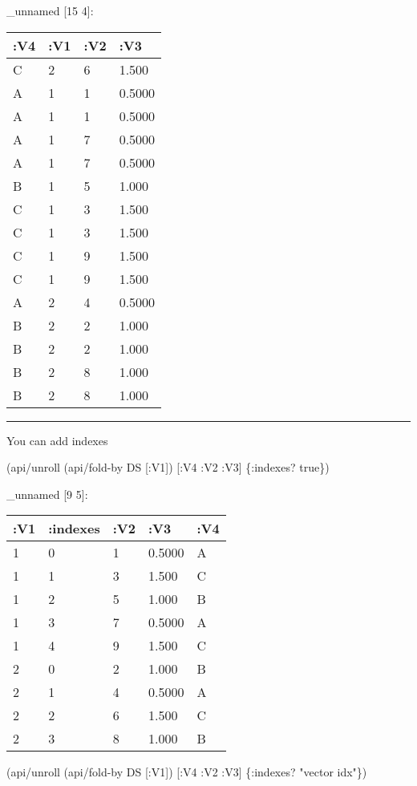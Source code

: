 \documentclass[]{article}
\newenvironment{Shaded}{\begin{snugshade}}{\end{snugshade}}
\newcommand{\StringTok}[1]{\textcolor[rgb]{0.31,0.60,0.02}{#1}}
\newcommand{\VariableTok}[1]{\textcolor[rgb]{0.00,0.00,0.00}{#1}}
\newcommand{\AttributeTok}[1]{\textcolor[rgb]{0.77,0.63,0.00}{#1}}
\newcommand{\NormalTok}[1]{#1}
\begin{document}
\_unnamed {[}15 4{]}:

\begin{longtable}[]{@{}llll@{}}
\toprule
:V4 & :V1 & :V2 & :V3\tabularnewline
\midrule
\endhead
C & 2 & 6 & 1.500\tabularnewline
A & 1 & 1 & 0.5000\tabularnewline
A & 1 & 1 & 0.5000\tabularnewline
A & 1 & 7 & 0.5000\tabularnewline
A & 1 & 7 & 0.5000\tabularnewline
B & 1 & 5 & 1.000\tabularnewline
C & 1 & 3 & 1.500\tabularnewline
C & 1 & 3 & 1.500\tabularnewline
C & 1 & 9 & 1.500\tabularnewline
C & 1 & 9 & 1.500\tabularnewline
A & 2 & 4 & 0.5000\tabularnewline
B & 2 & 2 & 1.000\tabularnewline
B & 2 & 2 & 1.000\tabularnewline
B & 2 & 8 & 1.000\tabularnewline
B & 2 & 8 & 1.000\tabularnewline
\bottomrule
\end{longtable}

\begin{center}\rule{0.5\linewidth}{0.5pt}\end{center}

You can add indexes

\begin{Shaded}
\begin{Highlighting}[]
\NormalTok{(api/unroll (api/fold-by DS [}\AttributeTok{:V1}\NormalTok{]) [}\AttributeTok{:V4} \AttributeTok{:V2} \AttributeTok{:V3}\NormalTok{] \{}\AttributeTok{:indexes}\NormalTok{? }\VariableTok{true}\NormalTok{\})}
\end{Highlighting}
\end{Shaded}

\_unnamed {[}9 5{]}:

\begin{longtable}[]{@{}lllll@{}}
\toprule
:V1 & :indexes & :V2 & :V3 & :V4\tabularnewline
\midrule
\endhead
1 & 0 & 1 & 0.5000 & A\tabularnewline
1 & 1 & 3 & 1.500 & C\tabularnewline
1 & 2 & 5 & 1.000 & B\tabularnewline
1 & 3 & 7 & 0.5000 & A\tabularnewline
1 & 4 & 9 & 1.500 & C\tabularnewline
2 & 0 & 2 & 1.000 & B\tabularnewline
2 & 1 & 4 & 0.5000 & A\tabularnewline
2 & 2 & 6 & 1.500 & C\tabularnewline
2 & 3 & 8 & 1.000 & B\tabularnewline
\bottomrule
\end{longtable}

\begin{Shaded}
\begin{Highlighting}[]
\NormalTok{(api/unroll (api/fold-by DS [}\AttributeTok{:V1}\NormalTok{]) [}\AttributeTok{:V4} \AttributeTok{:V2} \AttributeTok{:V3}\NormalTok{] \{}\AttributeTok{:indexes}\NormalTok{? }\StringTok{"vector idx"}\NormalTok{\})}
\end{Highlighting}
\end{Shaded}
\end{document}
